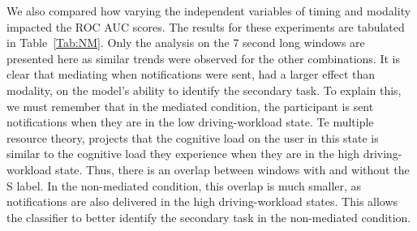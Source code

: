 We also compared how varying the independent variables of timing and modality impacted the ROC AUC scores. The results for these experiments are tabulated in Table~\ref{Tab:NM}. Only the analysis on the 7 second long windows are presented here as similar trends were observed for the other combinations. It is clear that mediating when notifications were sent, had a larger effect than modality, on the model's ability to identify the secondary task. To explain this, we must remember that in the mediated condition, the participant is sent notifications when they are in the low driving-workload state. Te multiple resource theory, projects that  the cognitive load on the user in this state is similar to the cognitive load they experience when they are in the high driving-workload state. Thus, there is an overlap between windows with and without the S label. In the non-mediated condition, this overlap is much smaller, as notifications are also delivered in the high driving-workload states. This allows the classifier to better identify the secondary task in the non-mediated condition.






